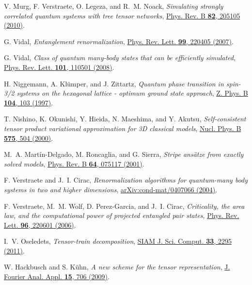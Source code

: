 \documentclass[english,11pt,aps,pra,onecolumn,tightenlines,groupedaddress,superscriptaddress,notitlepage,floatfix,fleqn]{revtex4-1}
\begin{document}
\begin{thebibliography}{10}
V. Murg, F. Verstraete, O. Legeza, and R.~M. Noack, {\em Simulating strongly
  correlated quantum systems with tree tensor networks},
  \href{https://doi.org/10.1103/PhysRevB.82.205105} {Phys. Rev. B {\bf 82},
  205105  (2010)}.

G. Vidal, {\em Entanglement renormalization},
  \href{https://doi.org/10.1103/PhysRevLett.99.220405} {Phys. Rev. Lett. {\bf
  99},  220405  (2007)}.

G. Vidal, {\em Class of quantum many-body states that can be efficiently
  simulated}, \href{https://doi.org/10.1103/PhysRevLett.101.110501} {Phys. Rev.
  Lett. {\bf 101},  110501  (2008)}.

H. Niggemann, A. Kl\"umper, and J. Zittartz, {\em Quantum phase transition in
  spin-3/2 systems on the hexagonal lattice - optimum ground state approach},
  \href{https://doi.org/10.1007/s002570050425} {Z. Phys. B {\bf 104},  103
  (1997)}.

T. Nishino, K. Okunishi, Y. Hieida, N. Maeshima, and Y. Akutsu, {\em
  Self-consistent tensor product variational approximation for 3D classical
  models}, \href{https://doi.org/10.1016/S0550-3213(00)00133-4} {Nucl. Phys. B
  {\bf 575},  504  (2000)}.

M.~A. Mart\'in-Delgado, M. Roncaglia, and G. Sierra, {\em Stripe ans\"atze from
  exactly solved models}, \href{https://doi.org/10.1103/PhysRevB.64.075117}
  {Phys. Rev. B {\bf 64},  075117  (2001)}.

F. Verstraete and J.~I. Cirac, {\em Renormalization algorithms for quantum-many
  body systems in two and higher dimensions},
  \href{http://arxiv.org/abs/cond-mat/0407066} {arXiv:cond-mat/0407066
  (2004)}.

F. Verstraete, M.~M. Wolf, D. Perez-Garcia, and J.~I. Cirac, {\em Criticality,
  the area law, and the computational power of projected entangled pair
  states}, \href{https://doi.org/10.1103/PhysRevLett.96.220601} {Phys. Rev.
  Lett. {\bf 96},  220601  (2006)}.

I.~V. Oseledets, {\em Tensor-train decomposition},
  \href{https://doi.org/10.1137/090752286} {SIAM J. Sci. Comput. {\bf 33},
  2295  (2011)}.

W. Hackbusch and S. K\"{u}hn, {\em A new scheme for the tensor representation},
  \href{https://doi.org/10.1007/s00041-009-9094-9} {J. Fourier Anal. Appl. {\bf
  15},  706  (2009)}.


\end{thebibliography}
\end{document}
